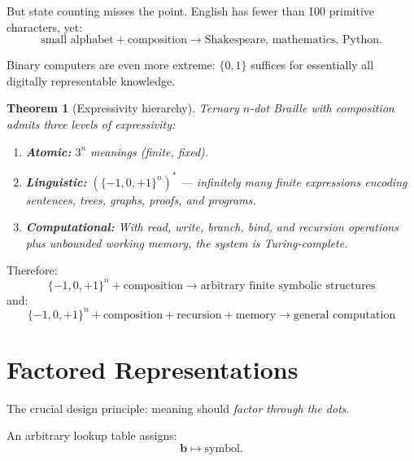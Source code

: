 \documentclass[11pt,a4paper]{article}
\newtheorem{theorem}{Theorem}
\newcommand{\bvec}{\bm{b}}
\begin{document}
But state counting misses the point.
English has fewer than 100 primitive characters, yet:
\begin{equation}
  \text{small alphabet} + \text{composition}
  \rightarrow
  \text{Shakespeare, mathematics, Python}.
\end{equation}

Binary computers are even more extreme: $\{0,1\}$ suffices for
essentially all digitally representable knowledge.

\begin{theorem}[Expressivity hierarchy]
  Ternary $n$-dot Braille with composition admits three levels
  of expressivity:
  \begin{enumerate}[label=\arabic*.]
    \item \textbf{Atomic:} $3^n$ meanings (finite, fixed).
    \item \textbf{Linguistic:} $(\{-1,0,+1\}^n)^*$ ---
      infinitely many finite expressions encoding
      sentences, trees, graphs, proofs, and programs.
    \item \textbf{Computational:} With read, write, branch, bind,
      and recursion operations plus unbounded working memory,
      the system is Turing-complete.
  \end{enumerate}
\end{theorem}

Therefore:
\begin{equation}
  \boxed{
    \{-1,0,+1\}^n + \text{composition}
    \rightarrow
    \text{arbitrary finite symbolic structures}
  }
\end{equation}
and:
\begin{equation}
  \boxed{
    \{-1,0,+1\}^n + \text{composition} + \text{recursion} + \text{memory}
    \rightarrow
    \text{general computation}
  }
\end{equation}

\section{Factored Representations}
\label{sec:factored}

The crucial design principle: meaning should \emph{factor through the dots}.

An arbitrary lookup table assigns:
\begin{equation}
  \bvec \mapsto \text{symbol}.
\end{equation}
\end{document}
